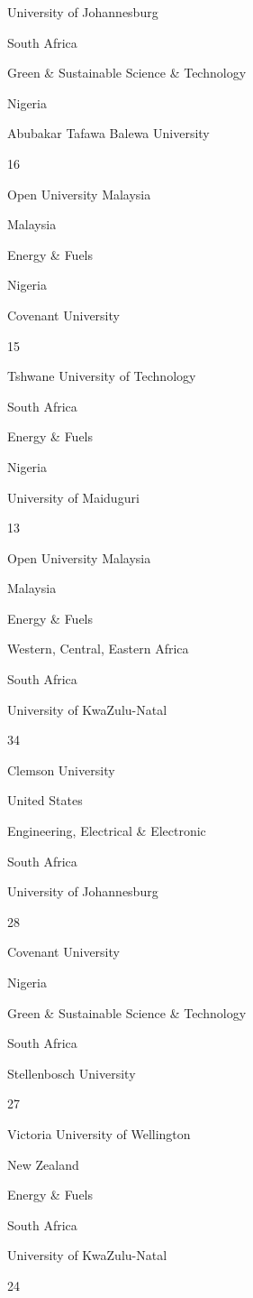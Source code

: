 \documentclass[12pt,twoside]{report}
\begin{document}
{University of Johannesburg }

{South Africa }

{Green \& Sustainable Science \& Technology}

{Nigeria }

{Abubakar Tafawa Balewa University}

{16}

{Open University Malaysia }

{Malaysia }

{Energy \& Fuels }

{Nigeria }

{Covenant University }

{15}

{Tshwane University of Technology }

{South Africa }

{Energy \& Fuels }

{Nigeria }

{University of Maiduguri }

{13}

{Open University Malaysia }

{Malaysia }

{Energy \& Fuels }

Western, Central, Eastern Africa

{South Africa}

{University of KwaZulu-Natal }

{34}

{Clemson University }

{United States}

{Engineering, Electrical \& Electronic }

{South Africa}

{University of Johannesburg }

{28}

{Covenant University }

{Nigeria }

{Green \& Sustainable Science \& Technology}

{South Africa}

{Stellenbosch University }

{27}

{Victoria University of Wellington }

{New Zealand }

{Energy \& Fuels }

{South Africa}

{University of KwaZulu-Natal }

{24}
\end{document}
